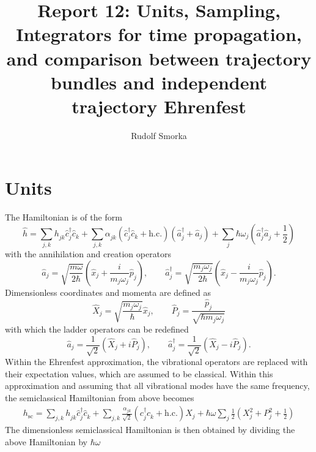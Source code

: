 \documentclass{article}
\newcommand{\pdagger}{{\phantom{\dagger}}}
\begin{document}
\title{Report 12: Units, Sampling, Integrators for time propagation, and comparison between trajectory bundles and independent trajectory Ehrenfest}
\author{Rudolf Smorka}
\maketitle
\section{Units}
The Hamiltonian is of the form
\begin{equation}
	\hat{h} = \sum_{j,k} h_{jk}^\pdagger \hat{c}_j^\dagger \hat{c}_k^\pdagger + \sum_{j,k}\alpha_{jk}^\pdagger (\hat{c}_j^\dagger \hat{c}_k^\pdagger+\mathrm{h.c.}) (\hat{a}_j^\dagger + \hat{a}_j) + \sum_j \hbar \omega_j \left(\hat{a}^\dagger_j \hat{a}^\pdagger_j+\frac{1}{2}\right)
\end{equation}
with the annihilation and creation operators
\begin{equation}
	\hat{a}_j = \sqrt{\frac{m\omega}{2\hbar}} \left(\hat{x}_j + \frac{i}{m_j\omega_j}\hat{p}_j\right), \qquad \hat{a}_j^\dagger = \sqrt{\frac{m_j\omega_j}{2\hbar}} \left(\hat{x}_j - \frac{i}{m_j\omega_j}\hat{p}_j\right).
\end{equation}
Dimensionless coordinates and momenta are defined as
\begin{equation}
	\hat{X}_j = \sqrt{\frac{m_j\omega_j}{\hbar}} \hat{x}_j, \qquad \hat{P}_j = \frac{\hat{p}_j}{\sqrt{\hbar m_j\omega_j}}
\end{equation}
with which the ladder operators can be redefined
\begin{equation}
	\hat{a}_j = \frac{1}{\sqrt{2}}(\hat{X}_j+i\hat{P}_j), \qquad \hat{a}_j^\dagger = \frac{1}{\sqrt{2}}(\hat{X}_j-i\hat{P}_j).
\end{equation}
Within the Ehrenfest approximation, the vibrational operators are replaced with their expectation values, which are assumed to be classical. Within this approximation and assuming that all vibrational modes have the same frequency, the semiclassical Hamiltonian from above becomes
\begin{align}
	h_\mathrm{sc} = \sum_{j,k}h_{jk}^\pdagger \hat{c}_j^\dagger \hat{c}_k^\pdagger + \sum_{j,k}\frac{\alpha_{jk}}{\sqrt{2}} (c_j^\dagger c_k^\pdagger + \mathrm{h.c.})X_j +  \hbar \omega \sum_{j} \frac{1}{2}\left(X_j^2+P_j^2+\frac{1}{2}\right)
\end{align}
The dimensionless semiclassical Hamiltonian is then obtained by dividing the above Hamiltonian by $\hbar \omega$
\end{document}
